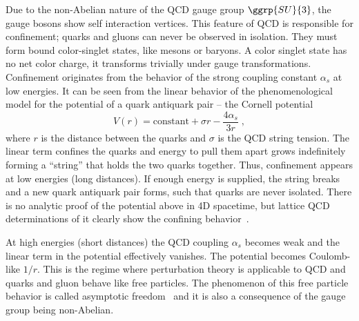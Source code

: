 Due to the non-Abelian nature of the QCD gauge group $\ggrp{SU}{3}$, the gauge bosons show self interaction vertices.
This feature of QCD is responsible for confinement; quarks and gluons can never be observed in isolation.
They must form bound color-singlet states, like mesons or baryons.
A color singlet state has no net color charge, it transforms trivially under  gauge transformations.
Confinement originates from the behavior of the strong coupling constant $\alpha_s$ at low energies.
It can be seen from the linear behavior of the phenomenological model for the potential of a quark antiquark pair -- the Cornell potential~\cite{PhysRevLett.34.369,PhysRevD.17.3090}
\begin{equation}
V(r) = \text{constant} + \sigma r - \frac{4 \alpha_s}{3r} \;,
\end{equation}
where $r$ is the distance between the quarks and $\sigma$ is the QCD string tension.
The linear term confines the quarks and energy to pull them apart grows indefinitely forming a ``string'' that holds the two quarks together.
Thus, confinement appears at low energies (long distances).
If enough energy is supplied, the string breaks and a new quark antiquark pair forms, such that quarks are never isolated.
There is no analytic proof of the potential above in 4D spacetime, but lattice QCD determinations of it clearly show the confining behavior~\cite{BORN1994325,PhysRevLett.107.091601}.

At high energies (short distances) the QCD coupling $\alpha_s$ becomes weak and the linear term in the potential effectively vanishes.
The potential becomes Coulomb-like $1/r$.
This is the regime where perturbation theory is applicable to QCD and quarks and gluon behave like free particles.
The phenomenon of this free particle behavior is called asymptotic freedom~\cite{PhysRevLett.30.1343,PhysRevLett.30.1346} and it is also a consequence of the gauge group being non-Abelian.


